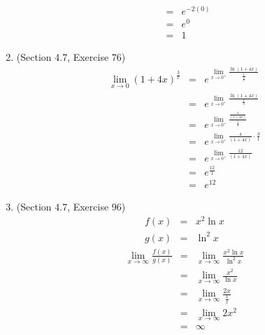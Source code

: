\documentclass{article}
\begin{document}
\begin{enumerate}
\begin{eqnarray}
                                     &=& e^{-2(0)} \\
                                     &=& e^{0} \\
                                     &=& 1
        \end{eqnarray}
    \item (Section 4.7, Exercise 76)
        \begin{eqnarray}
            \lim_{x \to 0}{\left(1 + 4x\right)^{\frac{3}{x}}} &=& e^{\lim\limits_{x \to 0^+}{\frac{\ln{\left(1 + 4x\right)}}{\frac{1}{\frac{3}{x}}}}} \\
                                                              &=& e^{\lim\limits_{x \to 0^+}{\frac{\ln{\left(1 + 4x\right)}}{\frac{x}{3}}}} \\
                                                              &=& e^{\lim\limits_{x \to 0^+}{\frac{\frac{4}{\left(1 + 4x\right)}}{\frac{1}{3}}}} \\
                                                              &=& e^{\lim\limits_{x \to 0^+}{\frac{4}{\left(1 + 4x\right)}\cdot\frac{3}{1}}} \\
                                                              &=& e^{\lim\limits_{x \to 0^+}{\frac{12}{\left(1 + 4x\right)}}} \\
                                                              &=& e^{\frac{12}{1}} \\
                                                              &=& e^{12}
        \end{eqnarray}
    \item (Section 4.7, Exercise 96)
        \begin{eqnarray}
            f(x) &=& x^2\ln{x} \\
            g(x) &=& \ln^2{x}
        \end{eqnarray}
        \begin{eqnarray}
            \lim_{x \to \infty}{\frac{f(x)}{g(x)}} &=& \lim_{x \to \infty}{\frac{x^2\ln{x}}{\ln^2{x}}} \\
                                                   &=& \lim_{x \to \infty}{\frac{x^2}{\ln{x}}} \\
                                                   &=& \lim_{x \to \infty}{\frac{2x}{\frac{1}{x}}} \\
                                                   &=& \lim_{x \to \infty}{2x^2} \\
                                                   &=& \infty
        \end{eqnarray}

\end{enumerate}
\end{document}
